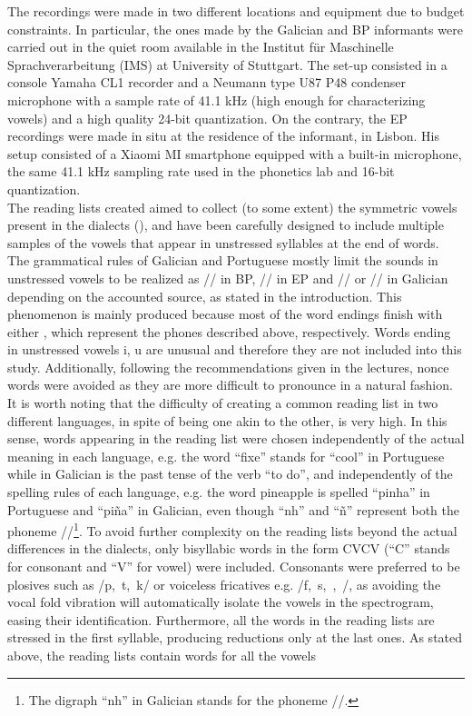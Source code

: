 \documentclass[a4paper,11pt]{article}
\begin{document}
     The recordings were made in two different locations and equipment due to budget constraints. In particular, the ones made by the Galician and BP informants were carried out in the quiet room available in the Institut für Maschinelle Sprachverarbeitung (IMS) at University of Stuttgart. The set-up consisted in a console Yamaha CL1 recorder and a Neumann type U87 P48 condenser microphone with a sample rate of 41.1 kHz (high enough for characterizing vowels) and a high quality 24-bit quantization. On the contrary, the EP recordings were made in situ at the residence of the informant, in Lisbon. His setup consisted of a Xiaomi MI smartphone equipped with a built-in microphone, the same 41.1 kHz sampling rate used in the phonetics lab and 16-bit quantization.\\
     
     The reading lists created aimed to collect (to some extent) the symmetric vowels present in the dialects (), and have been carefully designed to include multiple samples of the vowels that appear in unstressed syllables at the end of words. The grammatical rules of Galician and Portuguese mostly limit the sounds in unstressed vowels to be realized as //\cite{BORGES2000} in BP,   // \cite{mateus2000phonology} in EP and  // or // \cite{figueiroa} in Galician depending on the accounted source, as stated in the introduction. This phenomenon is mainly produced because most of the word endings finish with either ,  which represent the phones described above, respectively. Words ending in unstressed vowels i, u are unusual and therefore they are not included into this study. Additionally, following the recommendations given in the lectures, nonce words were avoided as they are more difficult to pronounce in a natural fashion. It is worth noting that the difficulty of creating a common reading list in two different languages, in spite of being one akin to the other, is very high. In this sense, words appearing in the reading list were chosen independently of the actual meaning in each language, e.g. the word ``fixe'' stands for ``cool'' in Portuguese while in Galician is the past tense of the verb ``to do'', and independently of the spelling rules of each language, e.g. the word pineapple is spelled ``pinha'' in Portuguese and ``piña'' in Galician, even though ``nh'' and ``ñ'' represent both the phoneme /\textipa{\textltailn}/\footnote{The digraph ``nh'' in Galician stands for the phoneme //.}.   To avoid further complexity on the reading lists beyond the actual differences in the dialects, only bisyllabic words in the form CVCV (``C'' stands for consonant and ``V'' for vowel) were included. Consonants were preferred to be plosives such as /p,~t,~k/ or voiceless fricatives e.g. /f,~s,~,~/, as avoiding the vocal fold vibration will automatically isolate the vowels in the spectrogram, easing their identification. Furthermore, all the words in the reading lists are stressed in the first syllable, producing reductions only at the last ones. As stated above, the reading lists contain words for all the vowels 
\end{document}
